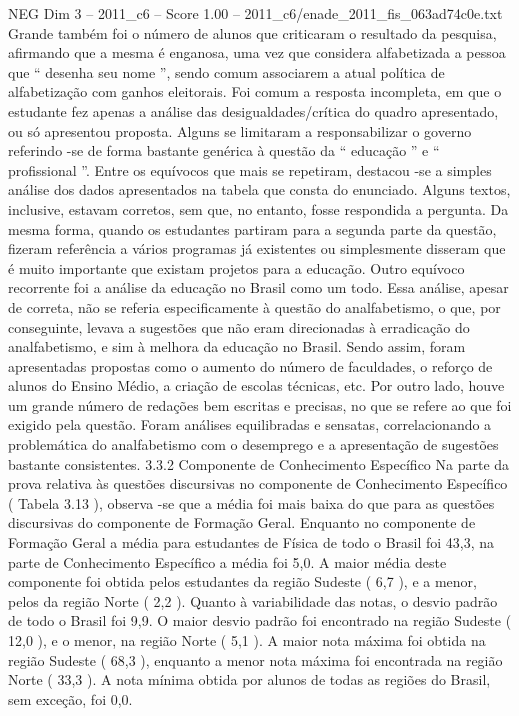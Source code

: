 \begin{textsample}{NEG Dim 3 – 2011\_c6 – Score 1.00 – 2011\_c6/enade\_2011\_fis\_063ad74c0e.txt}
Grande também foi o número de alunos que criticaram o resultado da pesquisa, afirmando que a mesma é enganosa, uma vez que considera alfabetizada a pessoa que “ desenha seu nome ”, sendo comum associarem a atual política de alfabetização com ganhos eleitorais.
Foi comum a resposta incompleta, em que o estudante fez apenas a análise das desigualdades/crítica do quadro apresentado, ou só apresentou proposta.
Alguns se limitaram a responsabilizar o governo referindo -se de forma bastante genérica à questão da “ educação ” e “ profissional ”.
Entre os equívocos que mais se repetiram, destacou -se a simples análise dos dados apresentados na tabela que consta do enunciado.
Alguns textos, inclusive, estavam corretos, sem que, no entanto, fosse respondida a pergunta.
Da mesma forma, quando os estudantes partiram para a segunda parte da questão, fizeram referência a vários programas já existentes ou simplesmente disseram que é muito importante que existam projetos para a educação.
Outro equívoco recorrente foi a análise da educação no Brasil como um todo.
Essa análise, apesar de correta, não se referia especificamente à questão do analfabetismo, o que, por conseguinte, levava a sugestões que não eram direcionadas à erradicação do analfabetismo, e sim à melhora da educação no Brasil.
Sendo assim, foram apresentadas propostas como o aumento do número de faculdades, o reforço de alunos do Ensino Médio, a criação de escolas técnicas, etc.
Por outro lado, houve um grande número de redações bem escritas e precisas, no que se refere ao que foi exigido pela questão.
Foram análises equilibradas e sensatas, correlacionando a problemática do analfabetismo com o desemprego e a apresentação de sugestões bastante consistentes. 3.3.2 Componente de Conhecimento Específico Na parte da prova relativa às questões discursivas no componente de Conhecimento Específico ( Tabela 3.13 ), observa -se que a média foi mais baixa do que para as questões discursivas do componente de Formação Geral.
Enquanto no componente de Formação Geral a média para estudantes de Física de todo o Brasil foi 43,3, na parte de Conhecimento Específico a média foi 5,0.
A maior média deste componente foi obtida pelos estudantes da região Sudeste ( 6,7 ), e a menor, pelos da região Norte ( 2,2 ).
Quanto à variabilidade das notas, o desvio padrão de todo o Brasil foi 9,9.
O maior desvio padrão foi encontrado na região Sudeste ( 12,0 ), e o menor, na região Norte ( 5,1 ).
A maior nota máxima foi obtida na região Sudeste ( 68,3 ), enquanto a menor nota máxima foi encontrada na região Norte ( 33,3 ).
A nota mínima obtida por alunos de todas as regiões do Brasil, sem exceção, foi 0,0.

\end{textsample}
